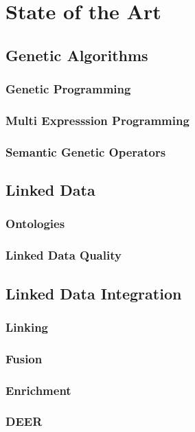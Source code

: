 \chapter{State of the Art}
\label{ch:sota}


\section{Genetic Algorithms}
\label{sec:ga}


\subsection{Genetic Programming}
\label{ssec:gp}


\subsection{Multi Expresssion Programming}
\label{ssec:mep}


\subsection{Semantic Genetic Operators}
\label{ssec:sgo}

\newpage
\section{Linked Data}
\label{sec:ld}


\subsection{Ontologies}
\label{ssec:ontologies}


\subsection{Linked Data Quality}
\label{ssec:ldq}

\newpage
\section{Linked Data Integration}
\label{sec:ldi}


\subsection{Linking}
\label{ssec:linking}


\subsection{Fusion}
\label{ssec:fusion}


\subsection{Enrichment}
\label{ssec:enrichment}


\subsection{\ac{DEER}}
\label{ssec:deer}
